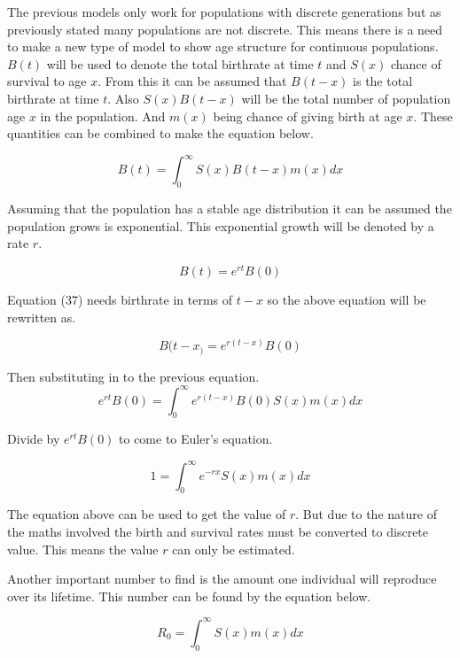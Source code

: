 \documentclass[final]{cmpreport}
\begin{document}
	The previous models only work for populations with discrete generations but as previously stated many populations are not discrete. This means there is a need to make a new type of model to show age structure for continuous populations. $B(t)$ will be used to denote the total birthrate at time $t$  and $S(x)$ chance of survival to age $x$.  From this it can be assumed that $B(t-x)$ is the total birthrate at time $t$. Also $S(x)B(t-x)$ will be the total number of population age $x$ in the population. And $m(x)$ being  chance of giving birth at age $x$. These quantities can be combined to make the equation below.
	
	\begin{equation}
	 B(t) = \int_0^\infty S(x)B(t-x)m(x) dx
	 \end{equation}
	 
	 Assuming that the population has a stable age distribution it can be assumed the population grows is exponential. This exponential growth will be denoted by a rate $r$. 
	
	 \begin{equation}
	  B(t) = e^{rt}B(0)
	 \end{equation}
	 
	 Equation (37) needs birthrate in terms of $t-x$ so the above equation will be rewritten as.
	 
	 \begin{equation}
	  B(t-x_) = e^{r(t-x)}B(0)  
	 \end{equation}
	 
	 Then substituting in to the previous equation.
	 \begin{equation}
	 e^{rt}B(0) =\int_0^\infty e^{r(t-x)}B(0)S(x)m(x) dx
	 \end{equation}
	 
	 Divide by  $e^{rt}B(0)$ to come to Euler's equation.
	 
	\begin{equation}
	  1= \int_0^\infty e^{-rx}S(x)m(x)dx 
	\end{equation}
	
	 The equation above can be used to get the value of $r$. But due to the nature of the maths involved the birth and survival rates must be converted to discrete value. This means the value $r$ can only be estimated.  
	 
	 Another important number to find is the amount one individual will reproduce over its lifetime. This number can be found by the equation below.
	 
	 \begin{equation}
	  R_0 = \int_0^\infty S(x)m(x) dx 
	  \end{equation} 
	 
\end{document}
